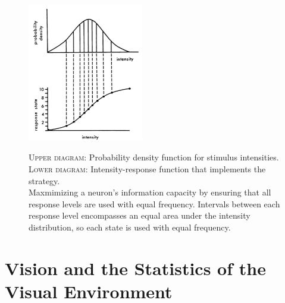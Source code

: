 \documentclass[twoside]{article}
\begin{document}
\begin{multicols}{2}
\begin{figure}[H]
	\caption{
		\textsc{Upper diagram:} Probability density function for stimulus intensities. \\ \textsc{Lower diagram:} Intensity-response function that implements the strategy. \\ Maxmimizing a neuron's information capacity by ensuring that all response levels are used with equal frequency. Intervals between each response level encompasses an equal area under the intensity distribution, so each state is used with equal frequency.
	}
	\includegraphics[width=0.45\textwidth]{laughlin1981-fig1}
	\label{fig:laughlin1981-fig1}
\end{figure}







\section{Vision and the Statistics of the Visual Environment}










\end{multicols}
\end{document}
